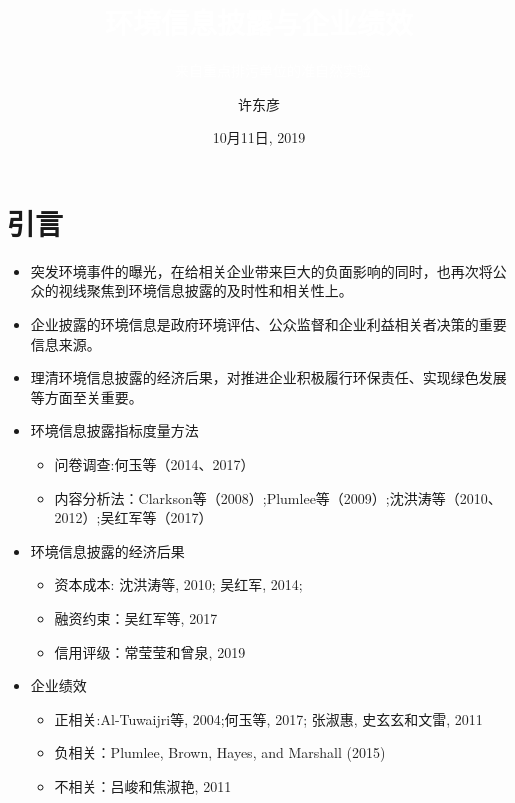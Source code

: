 \documentclass{beamer}	%
\title{\textcolor{white}{环境信息披露与企业绩效}}
\subtitle{\textcolor{white}{——来自重点排污单位的准自然实验}}
\author{许东彦}
\institute{东北财经大学经济学院}
\date{10月11日, 2019}
\theoremstyle{plain}
\theoremstyle{definition}
\theoremstyle{remark}
\numberwithin{equation}{section}
\begin{document}
\begin{frame}
\titlepage
\end{frame}

\begin{frame}           %
\tableofcontents        %
\end{frame}
\section{引言}
\begin{frame}
	\begin{itemize}[<+->]
		\item 突发环境事件的曝光，在给相关企业带来巨大的负面影响的同时，也再次将公众的视线聚焦到环境信息披露的及时性和相关性上。
		\item 企业披露的环境信息是政府环境评估、公众监督和企业利益相关者决策的重要信息来源。
		\item 理清环境信息披露的经济后果，对推进企业积极履行环保责任、实现绿色发展等方面至关重要。
	\end{itemize}
\end{frame}
\begin{frame}
	\begin{itemize}[<+->]
		\item 环境信息披露指标度量方法
			\begin{itemize}
				\item 问卷调查:何玉等（2014、2017）
				\item 内容分析法：Clarkson等（2008）;Plumlee等（2009）;沈洪涛等（2010、2012）;吴红军等（2017）
			\end{itemize}
		\item 环境信息披露的经济后果
			\begin{itemize}
				\item 资本成本:\color{red}{Richardson和Welker, 2001;}\color{black} 沈洪涛等, 2010; 吴红军, 2014;\color{gray}{Clarkson, Fang, Li,和Richardson, 2013}
				\item 融资约束：吴红军等, 2017
				\item 信用评级：常莹莹和曾泉, 2019
			\end{itemize}
		\item 企业绩效
		\begin{itemize}
			\item 正相关:Al-Tuwaijri等, 2004;何玉等, 2017; 张淑惠, 史玄玄和文雷, 2011
			\item 负相关：Plumlee, Brown, Hayes, and Marshall (2015)
			\item 不相关：吕峻和焦淑艳, 2011
		\end{itemize}
	\end{itemize}
\end{frame}
\end{document}
